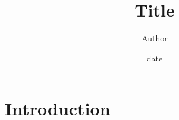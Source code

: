 \documentclass{article}
\title{{{Title}}}
\author{{{Author}}}
\date{{{date}}}
\begin{document}
\maketitle

\section{Introduction}
\end{document}
